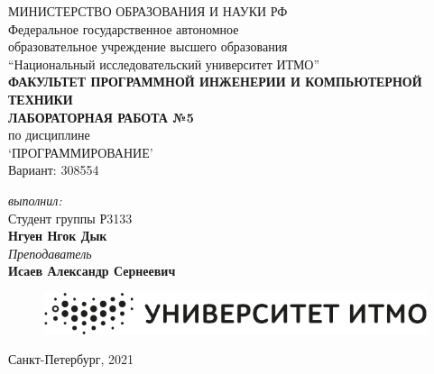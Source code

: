 \begin{center}
	МИНИСТЕРСТВО ОБРАЗОВАНИЯ И НАУКИ РФ\\
	\hfill \break
	Федеральное государственное автономное\\
	образовательное учреждение высшего образования\\
	``Национальный исследовательский университет ИТМО''\\
	\hfill \break
	\textbf{ФАКУЛЬТЕТ ПРОГРАММНОЙ ИНЖЕНЕРИИ И КОМПЬЮТЕРНОЙ ТЕХНИКИ}\\
	\vspace{2.5cm}
	\large{\textbf{ЛАБОРАТОРНАЯ РАБОТА №5}}\\
	\hfill \break
	по дисциплине\\
	\large{`ПРОГРАММИРОВАНИЕ'}\\
	\hfill \break
	Вариант: 308554\\
	
	\vspace{8cm}
	
	\begin{flushright}
	\textit{выполнил:}\\
	Студент группы Р3133\\
	\textbf{Нгуен Нгок Дык}\\
	\textit{Преподаватель}\\
	\textbf{Исаев Александр Сернеевич}
	\end{flushright}
\end{center}

\vfill

\begin{figure}[H]
\centering
\includegraphics[scale=0.5]{img/logo}
\end{figure}

\begin{center} Санкт-Петербург, 2021
\end{center}

\thispagestyle{empty}
\newpage